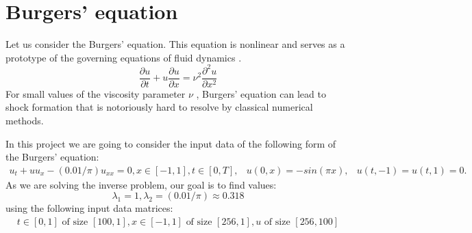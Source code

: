 \documentclass{beamer}
\def\\{}%
\begin{document}



\section{Burgers' equation}

\begin{frame}

Let us consider the Burgers' equation. This equation is nonlinear and serves as a prototype of the governing equations of fluid dynamics \cite{comp1986fluids}. 
\begin{equation}
    \frac{\partial u}{\partial t} + u \frac{\partial u}{\partial x} = \nu^2 \frac{\partial^2 u}{\partial x^2}
\end{equation}
For small values of the viscosity parameter $\nu$ , Burgers' equation can lead to shock formation that is notoriously hard to resolve by classical numerical methods. 

\end{frame}

\begin{frame}
In this project we are going to consider the input data of the following form of
the Burgers' equation:
\begin{align}
u_t + u u_x - (0.01/\pi)u_{xx} = 0, x \in [-1, 1], t \in [0, T], &\\
u(0, x) = -sin(\pi x), & \\
u(t, -1) = u(t, 1) = 0.&
\end{align}
As we are solving the inverse problem, our goal is to find values:
\[
    \lambda_1 = 1,  \lambda_2 = (0.01 / \pi) \approx 0.318
\]
using the
following input data matrices: 
\begin{align}
t \in [0, 1] \text{ of size } [100, 1], \\ x
\in [-1, 1] \text{ of size } [256, 1], u \text{ of size } [256, 100]
\end{align}

\end{frame}
\end{document}
